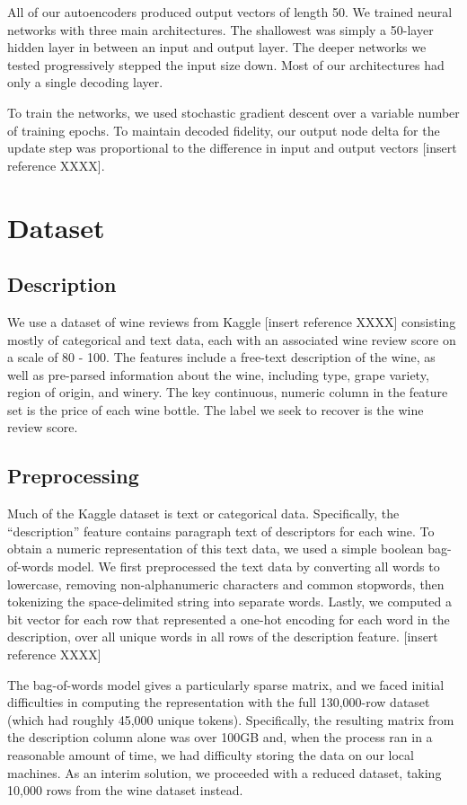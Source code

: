 \documentclass{article}
\begin{document}
All of our autoencoders produced output vectors of length 50. We trained neural networks with three main architectures. The shallowest was simply a 50-layer hidden layer in between an input and output layer. The deeper networks we tested progressively stepped the input size down. Most of our architectures had only a single decoding layer.

To train the networks, we used stochastic gradient descent over a variable number of training epochs. To maintain decoded fidelity, our output node delta for the update step was proportional to the difference in input and output vectors [insert reference XXXX]. 
\section{Dataset}
\subsection{Description}
We use a dataset of wine reviews from Kaggle [insert reference XXXX] consisting mostly of categorical and text data, each with an associated wine review score on a scale of 80 - 100. The features include a free-text description of the wine, as well as pre-parsed information about the wine, including type, grape variety, region of origin, and winery. The key continuous, numeric column in the feature set is the price of each wine bottle. The label we seek to recover is the wine review score.

\subsection{Preprocessing}
Much of the Kaggle dataset is text or categorical data. Specifically, the “description” feature contains paragraph text of descriptors for each wine. To obtain a numeric representation of this text data, we used a simple boolean bag-of-words model. We first preprocessed the text data by converting all words to lowercase, removing non-alphanumeric characters and common stopwords, then tokenizing the space-delimited string into separate words. Lastly, we computed a bit vector for each row that represented a one-hot encoding for each word in the description, over all unique words in all rows of the description feature. [insert reference XXXX]

The bag-of-words model gives a particularly sparse matrix, and we faced initial difficulties in computing the representation with the full 130,000-row dataset (which had roughly 45,000 unique tokens). Specifically, the resulting matrix from the description column alone was over 100GB and, when the process ran in a reasonable amount of time, we had difficulty storing the data on our local machines. As an interim solution, we proceeded with a reduced dataset, taking 10,000 rows from the wine dataset instead. 
\end{document}
